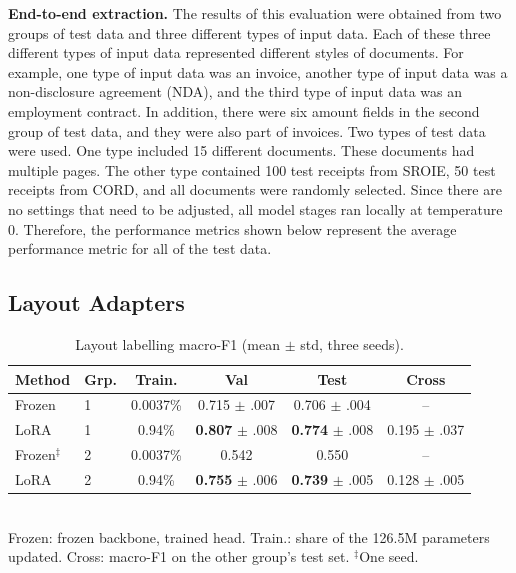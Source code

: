 \documentclass[conference]{IEEEtran}
\begin{document}
\textbf{End-to-end extraction.} The results of this evaluation were obtained from two groups of test data and three different types of input data. Each of these three different types of input data represented different styles of documents. For example, one type of input data was an invoice, another type of input data was a non-disclosure agreement (NDA), and the third type of input data was an employment contract. In addition, there were six amount fields in the second group of test data, and they were also part of invoices. Two types of test data were used. One type included 15 different documents. These documents had multiple pages. The other type contained 100 test receipts from SROIE, 50 test receipts from CORD, and all documents were randomly selected. Since there are no settings that need to be adjusted, all model stages ran locally at temperature 0. Therefore, the performance metrics shown below represent the average performance metric for all of the test data.

\subsection{Layout Adapters}
\label{sec:res_lora}

\begin{table}[t]
\centering
\caption{Layout labelling macro-F1 (mean $\pm$ std, three seeds).}
\label{tab:lora_results}
\footnotesize
\setlength{\tabcolsep}{2.5pt}
\begin{tabular}{llcccc}
\toprule
\textbf{Method} & \textbf{Grp.} & \textbf{Train.} & \textbf{Val} & \textbf{Test} & \textbf{Cross} \\
\midrule
Frozen & 1 & 0.0037\% & 0.715 $\pm$ .007 & 0.706 $\pm$ .004 & -- \\
LoRA & 1 & 0.94\% & \textbf{0.807} $\pm$ .008 & \textbf{0.774} $\pm$ .008 & 0.195 $\pm$ .037 \\
\midrule
Frozen$^\ddagger$ & 2 & 0.0037\% & 0.542 & 0.550 & -- \\
LoRA & 2 & 0.94\% & \textbf{0.755} $\pm$ .006 & \textbf{0.739} $\pm$ .005 & 0.128 $\pm$ .005 \\
\bottomrule
\end{tabular}\\[2pt]
{\scriptsize Frozen: frozen backbone, trained head. Train.: share of the 126.5M parameters updated. Cross: macro-F1 on the other group's test set. $^\ddagger$One seed.}
\end{table}
\end{document}
